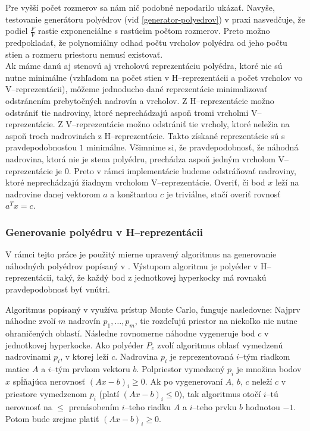 Pre vyšší počet rozmerov sa nám nič podobné nepodarilo ukázať. Navyše, testovanie generátoru polyédrov (viď \ref{generator-polyedrov}) v praxi nasvedčuje, že podiel $\frac F V$ rastie exponenciálne s rastúcim počtom rozmerov. Preto možno predpokladať, že polynomiálny odhad počtu vrcholov polyédra od jeho počtu stien a rozmeru priestoru nemusí existovať.\\

Ak máme danú aj stenovú aj vrcholovú reprezentáciu polyédra, ktoré nie sú nutne minimálne (vzhľadom na počet stien v H--reprezentácii a počet vrcholov vo V--reprezentácii), môžeme jednoducho dané reprezentácie minimalizovať odstránením prebytočných nadrovín a vrcholov. Z H--reprezentácie možno odstrániť tie nadroviny, ktoré neprechádzajú aspoň tromi vrcholmi V--reprezentácie. Z V--reprezentácie možno odstrániť tie vrcholy, ktoré neležia na aspoň troch nadrovinách z H--reprezentácie. Takto získané reprezentácie sú s pravdepodobnosťou $1$ minimálne. Všimnime si, že pravdepodobnosť, že náhodná nadrovina, ktorá nie je stena polyédru, prechádza aspoň jedným vrcholom V--reprezentácie je $0$. Preto v rámci implementácie budeme odstráňovať nadroviny, ktoré neprechádzajú žiadnym vrcholom V--reprezentácie.
Overiť, či bod $x$ leží na nadrovine danej vektorom $a$ a konštantou $c$ je triviálne, stačí overiť rovnosť $a^Tx=c$.

\subsubsection{Generovanie polyédru v H--reprezentácii}

V rámci tejto práce je použitý mierne upravený algoritmus na generovanie náhodných polyédrov popísaný v \cite{random_may}. Výstupom algoritmu je polyéder v H--reprezentácii, taký, že každý bod z jednotkovej hyperkocky má rovnakú pravdepodobnosť byť vnútri. 

Algoritmus popísaný v \cite{random_may} využíva prístup Monte Carlo, funguje nasledovne: Najprv náhodne zvolí $m$ nadrovín $p_1, \dots, p_m$, tie rozdeľujú priestor na niekoľko nie nutne ohraničených oblastí.
Následne rovnomerne náhodne vygeneruje bod $c$ v jednotkovej hyperkocke. Ako polyéder $P_c$ zvolí algoritmus oblasť vymedzenú nadrovinami $p_i$, v ktorej leží $c$. Nadrovina $p_i$ je reprezentovaná $i$--tým riadkom matice $A$ a $i$--tým prvkom vektoru $b$. Polpriestor vymedzený $p_i$ je množina bodov $x$ spĺňajúca nerovnosť $(Ax-b)_i \geq 0$. Ak po vygenerovaní $A$, $b$, $c$ neleží $c$ v priestore vymedzenom $p_i$ (platí $(Ax-b)_i \leq 0$), tak algoritmus otočí $i$--tú nerovnosť na $\leq$ prenásobením $i$--teho riadku $A$ a $i$--teho prvku $b$ hodnotou $-1$. Potom bude zrejme platiť $(Ax-b)_i \geq 0$.

